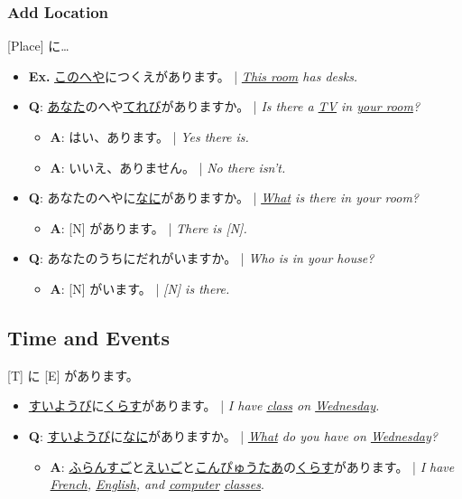 \documentclass{article}
\begin{document}
\begin{CJK}{UTF8}{min}
\clearpage

\subsubsection{Add Location}

[Place] に…

\begin{itemize}
\item {\bf Ex.} \uline{このへや}につくえがあります。 | {\it \uline{This room} has desks.}
\item {\bf Q}: \uline{あなた}のへや\uline{てれび}がありますか。 | {\it Is there a \uline{TV} in \uline{your room}?}
\begin{itemize}
\item {\bf A}: はい、あります。 | {\it Yes there is.}
\item {\bf A}: いいえ、ありません。 | {\it No there isn't.}
\end{itemize}
\item {\bf Q}: あなたのへやに\uline{なに}がありますか。 | \emph{\uline{What} is there in your room?}
\begin{itemize}
\item {\bf A}: [N] があります。 | \emph{There is \emph{[N]}.}
\end{itemize}
\item {\bf Q}: あなたのうちにだれがいますか。 | {\it Who is in your house?}
\begin{itemize}
\item {\bf A}: [N] がいます。 | \emph{\emph{[N]} is there.}
\end{itemize}
\end{itemize}

\subsection{Time and Events}

[T] に [E] があります。

\begin{itemize}
\item \uline{すいようび}に\uline{くらす}があります。 | {\it I have \uline{class} on \uline{Wednesday}.}
\item {\bf Q}: \uline{すいようび}に\uline{なに}がありますか。 | {\it \uline{What} do you have on \uline{Wednesday}?}
\begin{itemize}
\item {\bf A}: \uline{ふらんすご}と\uline{えいご}と\uline{こんぴゅうたあ}の\uline{くらす}があります。 | {\it I have \uline{French}, \uline{English}, and \uline{computer} \uline{classes}}.
\end{itemize}
\end{itemize}


\end{CJK}
\end{document}
